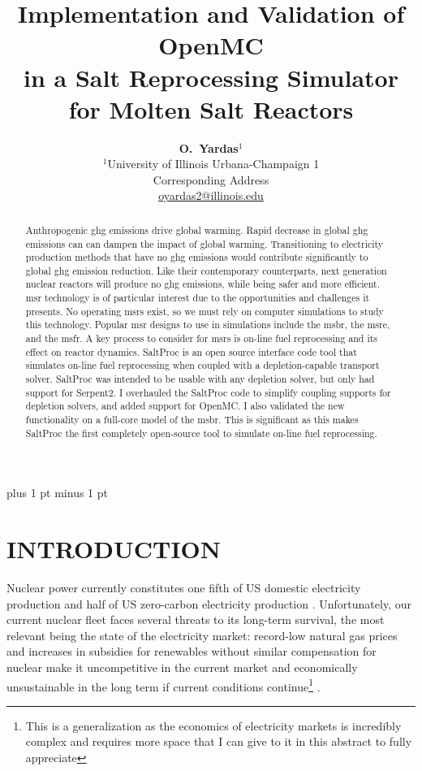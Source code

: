 \documentclass[letterpaper]{mc2023}
\title{Implementation and Validation of OpenMC \\
in a Salt Reprocessing Simulator for Molten Salt Reactors}
\author{%
  \textbf{O.~Yardas$^1$}\vspace{3pt} \\
  $^1$University of Illinois Urbana-Champaign 1  \\
  Corresponding Address \vspace{6pt}\\ 
  \url{oyardas2@illinois.edu}
}
\begin{document}

\maketitle
\justify 
\parskip 6pt plus 1 pt minus 1 pt

\begin{abstract}
  Anthropogenic \Gls{ghg} emissions drive global warming. Rapid decrease in
  global \Gls{ghg} emissions can can dampen the impact of global warming.
  Transitioning to electricity production methods that have no \Gls{ghg}
  emissions would contribute significantly to global \Gls{ghg} emission
  reduction. Like their contemporary counterparts, next generation nuclear
  reactors will produce no \Gls{ghg} emissions, while being safer and more
  efficient. \Gls{msr} technology is of particular interest due to the
  opportunities and challenges it presents. No operating \Gls{msr}s exist, so we
  must rely on computer simulations to study this technology. Popular \Gls{msr}
  designs to use in simulations include the \Gls{msbr}, the \Gls{msre}, and the
  \Gls{msfr}. A key process to consider for \Gls{msr}s is on-line fuel
  reprocessing and its effect on reactor dynamics. SaltProc is an open source
  interface code tool that simulates on-line fuel reprocessing when coupled with
  a depletion-capable transport solver. SaltProc was intended to be usable with
  any depletion solver, but only had support for Serpent2. I overhauled the
  SaltProc code to simplify coupling supports for depletion solvers, and added
  support for OpenMC. I also validated the new functionality on a full-core model
  of the \Gls{msbr}. This is significant as this makes SaltProc the first
  completely open-source tool to simulate on-line fuel reprocessing.
\end{abstract}
\vspace{6pt}

\section{INTRODUCTION} 
Nuclear power currently constitutes one fifth of US domestic electricity
production and half of US zero-carbon electricity production
\cite{eia_faq_2021} \cite{doene_facts_2021}. Unfortunately, our current nuclear
fleet faces several threats to its long-term survival, the most relevant being
the state of the electricity market: record-low natural gas prices and
increases in subsidies for renewables without similar compensation for
nuclear make it uncompetitive in the current market and economically unsustainable in the
long term if current conditions continue\footnote{This is a generalization as
the economics of electricity markets is incredibly complex and requires more space that I can give to it
in this abstract to fully appreciate} \cite{szilard_economic_2016}.
\end{document}

